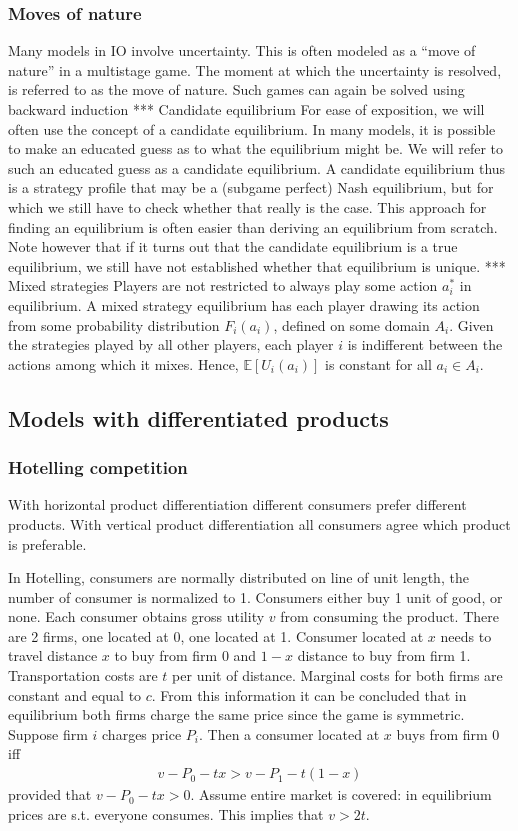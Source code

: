 \documentclass[11pt]{article}
\numberwithin{equation}{section}
\newcommand{\1}[1]{\,I_{#1}} %
\begin{document}
\subsubsection{Moves of nature}
Many models in IO involve uncertainty. This is often modeled as a “move of nature” in a
multistage game. The moment at which the uncertainty is resolved, is referred to as the
move of nature. Such games can again be solved using backward induction
*** Candidate equilibrium
For ease of exposition, we will often use the concept of a candidate equilibrium. In many
models, it is possible to make an educated guess as to what the equilibrium might be. We
will refer to such an educated guess as a candidate equilibrium. A candidate equilibrium thus is a
strategy profile that may be a (subgame perfect) Nash equilibrium, but for
which we still have to check whether that really is the case. This approach for finding
an equilibrium is often easier than deriving an equilibrium from scratch. Note however
that if it turns out that the candidate equilibrium is a true equilibrium, we still have not
established whether that equilibrium is unique.
*** Mixed strategies
Players are not restricted to always play some action $a_i^*$ in equilibrium. A mixed strategy
equilibrium has each player drawing its action from some probability distribution $F_i(a_i)$,
defined on some domain $A_i$. Given the strategies played by all other players, each player $i$
is indifferent between the actions among which it mixes. Hence, $\mathbb{E}[U_i(a_i)]$ is constant
for all $a_i\in A_i$.
\subsection{Models with differentiated products}
\subsubsection{Hotelling competition}
With horizontal product differentiation different consumers prefer different products. With
vertical product differentiation all consumers agree which product is preferable.

In Hotelling, consumers are normally distributed on line of unit length, the number of consumer
is normalized to 1. Consumers either buy 1 unit of good, or none. Each consumer obtains gross
utility $v$ from consuming the product. There are 2 firms, one located at 0, one located at 1.
Consumer located at $x$ needs to travel distance $x$ to buy from firm 0 and $1-x$ distance to
buy from firm 1. Transportation costs are $t$ per unit of distance. Marginal costs for both firms
are constant and equal to $c$. From this information it can be concluded that in equilibrium both
firms charge the same price since the game is symmetric.
Suppose firm $i$ charges price $P_i$. Then a consumer located at $x$ buys from firm 0 iff
\begin{align}
	v-P_0-tx>v-P_1-t(1-x)
\end{align}
provided that $v-P_0-tx>0$. Assume entire market is covered: in equilibrium prices are s.t.
everyone consumes. This implies that $v>2t$.
\end{document}
